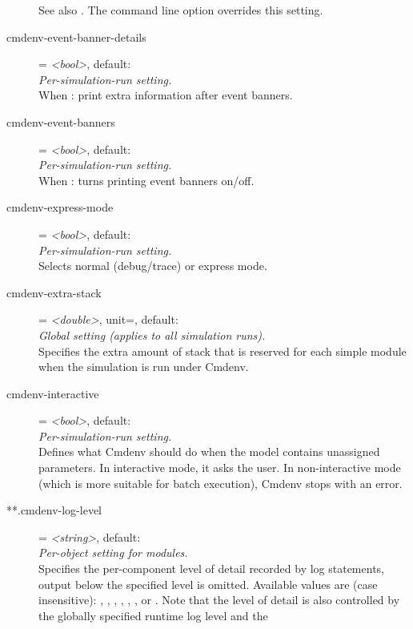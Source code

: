 \begin{description}
    See also
    . The
     command line option overrides this setting.
\item[cmdenv-event-banner-details] = \textit{<bool>}, default: \\
    \textit{Per-simulation-run setting.}\\
    When
    :
    print extra information after event banners.
\item[cmdenv-event-banners] = \textit{<bool>}, default: \\
    \textit{Per-simulation-run setting.}\\
    When
    :
    turns printing event banners on/off.
\item[cmdenv-express-mode] = \textit{<bool>}, default: \\
    \textit{Per-simulation-run setting.}\\
    Selects normal (debug/trace) or express mode.
\item[cmdenv-extra-stack] = \textit{<double>}, unit=, default: \\
    \textit{Global setting (applies to all simulation runs).}\\
    Specifies the extra amount of stack that is reserved for each
     simple module when the simulation is run under Cmdenv.
\item[cmdenv-interactive] = \textit{<bool>}, default: \\
    \textit{Per-simulation-run setting.}\\
    Defines what Cmdenv should do when the model contains unassigned
    parameters. In interactive mode, it asks the user. In non-interactive mode
    (which is more suitable for batch execution), Cmdenv stops with an error.
\item[**.cmdenv-log-level] = \textit{<string>}, default: \\
    \textit{Per-object setting for modules.}\\
    Specifies the per-component level of detail recorded by log statements,
    output below the specified level is omitted. Available values are (case
    insensitive): , , , , ,
    ,  or . Note that the level of detail is
    also controlled by the globally specified runtime log level and the

\end{description}
